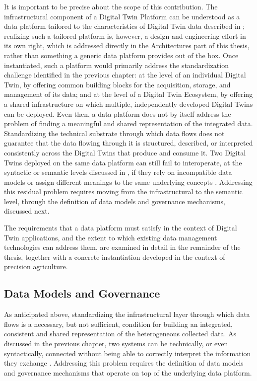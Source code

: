 It is important to be precise about the scope of this contribution. The infrastructural component of a Digital Twin Platform can be understood as a data platform tailored to the characteristics of Digital Twin data described in ; realizing such a tailored platform is, however, a design and engineering effort in its own right, which is addressed directly in the Architectures part of this thesis, rather than something a generic data platform provides out of the box. Once instantiated, such a platform would primarily address the standardization challenge identified in the previous chapter: at the level of an individual Digital Twin, by offering common building blocks for the acquisition, storage, and management of its data; and at the level of a Digital Twin Ecosystem, by offering a shared infrastructure on which multiple, independently developed Digital Twins can be deployed. Even then, a data platform does not by itself address the problem of finding a meaningful and shared representation of the integrated data. Standardizing the technical substrate through which data flows does not guarantee that the data flowing through it is structured, described, or interpreted consistently across the Digital Twins that produce and consume it. Two Digital Twins deployed on the same data platform can still fail to interoperate, at the syntactic or semantic levels discussed in , if they rely on incompatible data models or assign different meanings to the same underlying concepts \cite{acharya2024interoperability,david2024interoperability}. Addressing this residual problem requires moving from the infrastructural to the semantic level, through the definition of data models and governance mechanisms, discussed next.

The requirements that a data platform must satisfy in the context of Digital Twin applications, and the extent to which existing data management technologies can address them, are examined in detail in the remainder of the thesis, together with a concrete instantiation developed in the context of precision agriculture.

\subsection{Data Models and Governance}

As anticipated above, standardizing the infrastructural layer through which data flows is a necessary, but not sufficient, condition for building an integrated, consistent and shared representation of the heterogeneous collected data. As discussed in the previous chapter, two systems can be technically, or even syntactically, connected without being able to correctly interpret the information they exchange \cite{kritzinger2018,fuller2020,acharya2024interoperability}. Addressing this problem requires the definition of data models and governance mechanisms that operate on top of the underlying data platform.

